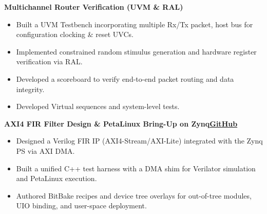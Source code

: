 \documentclass[a4paper,10pt]{article}
\begin{document}
\textbf{Multichannel Router Verification (UVM \& RAL)}
\begin{itemize}
    \item Built a UVM Testbench incorporating multiple Rx/Tx packet, host bus for configuration clocking \& reset UVCs.
    \item Implemented constrained random stimulus generation and hardware register verification via RAL.
    \item Developed a scoreboard to verify end-to-end packet routing and data integrity.
    \item Developed Virtual sequences and system-level tests.
\end{itemize}

\textbf{AXI4 FIR Filter Design \& PetaLinux Bring-Up on Zynq}\hfill \href{https://github.com/mohamedtareq24/petalinux-demo}{\textbf{GitHub}}
\begin{itemize}
  \item Designed a Verilog FIR IP (AXI4-Stream/AXI-Lite) integrated with the Zynq PS via AXI DMA.
  \item Built a unified C++ test harness with a DMA shim for Verilator simulation and PetaLinux execution.
  \item Authored BitBake recipes and device tree overlays for out-of-tree modules, UIO binding, and user-space deployment.
\end{itemize}
\enlargethispage{7\baselineskip}
\vspace{1pt}
\end{document}
